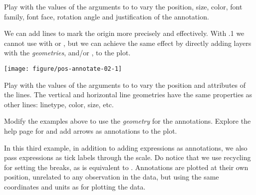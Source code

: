 \documentclass[krantz2]{krantz}\usepackage{knitr}%
\begin{document}
\begin{playground}
Play with the values of the arguments to  to vary the position, size, color, font family, font face, rotation angle and justification of the annotation.
\end{playground}

We can add lines to mark the origin more precisely and effectively. With .1 we cannot use  with  or , but we can achieve the same effect by directly adding layers with the \emph{geometries},  and/or  , to the plot.

\begin{knitrout}\footnotesize
{}\color{fgcolor}\begin{kframe}
\begin{alltt}
  \hlopt{+}
  \hlstd{()} \hlopt{+}
  \hlstd{(} \hlstd{=} \hlstd{,}  \hlstd{=} \hlstd{)} \hlopt{+}
  \hlstd{(} \hlstd{=} \hlstd{,}  \hlstd{=} \hlstd{)}
\end{alltt}
\end{kframe}

{\centering \texttt{[image: figure/pos-annotate-02-1]} 

}



\end{knitrout}

\begin{playground}
Play with the values of the arguments to   to vary the position and attributes of the lines. The vertical and horizontal line geometries have the same properties as other lines: linetype, color, size, etc.
\end{playground}

\begin{playground}
Modify the examples above to use the  \emph{geometry} for the annotations. Explore the help page for  and add arrows as annotations to the plot.
\end{playground}

In this third example, in addition to adding expressions as annotations, we also pass expressions as tick labels through the scale. Do notice that we use recycling for setting the breaks, as  is equivalent to . Annotations are plotted at their own position, unrelated to any observation in the data, but using the same coordinates and units as for plotting the data.
\end{document}
